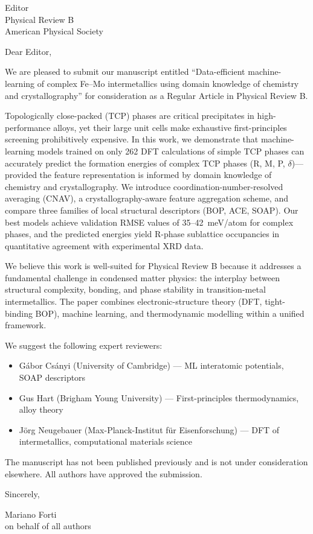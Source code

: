 \documentclass[12pt]{letter}
\date{\today}
\begin{document}
\begin{letter}{Editor \\
               Physical Review B \\
               American Physical Society}

\opening{Dear Editor,}

We are pleased to submit our manuscript entitled ``Data-efficient machine-learning of complex Fe--Mo intermetallics using domain knowledge of chemistry and crystallography'' for consideration as a Regular Article in Physical Review B.

Topologically close-packed (TCP) phases are critical precipitates in high-performance alloys, yet their large unit cells make exhaustive first-principles screening prohibitively expensive. In this work, we demonstrate that machine-learning models trained on only 262 DFT calculations of simple TCP phases can accurately predict the formation energies of complex TCP phases (R, M, P, $\delta$)---provided the feature representation is informed by domain knowledge of chemistry and crystallography. We introduce coordination-number-resolved averaging (CNAV), a crystallography-aware feature aggregation scheme, and compare three families of local structural descriptors (BOP, ACE, SOAP). Our best models achieve validation RMSE values of 35--42~meV/atom for complex phases, and the predicted energies yield R-phase sublattice occupancies in quantitative agreement with experimental XRD data.

We believe this work is well-suited for Physical Review B because it addresses a fundamental challenge in condensed matter physics: the interplay between structural complexity, bonding, and phase stability in transition-metal intermetallics. The paper combines electronic-structure theory (DFT, tight-binding BOP), machine learning, and thermodynamic modelling within a unified framework.

We suggest the following expert reviewers:
\begin{itemize}
  \item G\'abor Cs\'anyi (University of Cambridge) --- ML interatomic potentials, SOAP descriptors
  \item Gus Hart (Brigham Young University) --- First-principles thermodynamics, alloy theory
  \item J\"org Neugebauer (Max-Planck-Institut f\"ur Eisenforschung) --- DFT of intermetallics, computational materials science
\end{itemize}

The manuscript has not been published previously and is not under consideration elsewhere. All authors have approved the submission.

\closing{Sincerely,}

Mariano Forti \\
on behalf of all authors

\end{letter}
\end{document}
